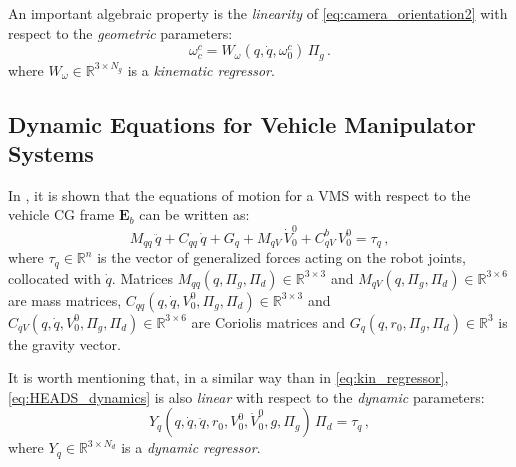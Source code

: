 An important algebraic property is the \textit{linearity} of \eqref{eq:camera_orientation2} with respect to the \textit{geometric} parameters:
%
\begin{equation}
\omega^{c}_{c} = W_\omega(q,\dot{q},\omega^{c}_{0}) \, \Pi_{g} \,.
\label{eq:kin_regressor}
\end{equation}
%
where $W_\omega \in \mathbb{R}^{3\times N_g}$ is a \textit{kinematic regressor}.

\subsection{Dynamic Equations for Vehicle Manipulator Systems}
\label{sec:NE_algorithm}

In \cite{Gravdahl2014}, it is shown that the equations of motion for a VMS with respect to the vehicle CG frame $\mathbf{E}_{b}$ can be written as:
%
%
\begin{equation}
M_{qq}\,\ddot{q} + C_{qq}\,\dot{q} + G_{q} + M_{qV}\,\dot{V}^{0}_{0} + C^{b}_{qV}\,V^{0}_{0} = \tau_q \,,
\label{eq:HEADS_dynamics}
\end{equation}
%
where $\tau_q \in \mathbb{R}^{n}$ is the vector of generalized forces acting on the robot joints, collocated with $\dot{q}$.
%
Matrices $M_{qq}(q,\Pi_g,\Pi_d) \in \mathbb{R}^{3 \times 3}$ and $M_{qV}(q,\Pi_g,\Pi_d) \in \mathbb{R}^{3 \times 6}$ are mass matrices,
%
$C_{qq}(q,\dot{q},V^{0}_{0},\Pi_g,\Pi_d) \in \mathbb{R}^{3 \times 3}$ and $C_{qV}(q,\dot{q},V^{0}_{0},\Pi_g,\Pi_d) \in \mathbb{R}^{3 \times 6}$ are Coriolis matrices 
%
and $G_{q}(q,r_{0},\Pi_g,\Pi_d) \in \mathbb{R}^{3}$ is the gravity vector.

It is worth mentioning that, in a similar way than in \eqref{eq:kin_regressor}, \eqref{eq:HEADS_dynamics} is also \textit{linear} with respect to the \textit{dynamic} parameters:
%
\begin{equation}
Y_q( q,\dot{q}, \ddot{q}, r_{0}, V^{0}_{0}, \dot{V}^{0}_{0}, g, \Pi_g) \, \Pi_{d} = \tau_q \,,
\label{eq:dyn_regressor}
\end{equation}
%
where $Y_q \in \mathbb{R}^{3\times N_d}$ is a \textit{dynamic regressor}.

